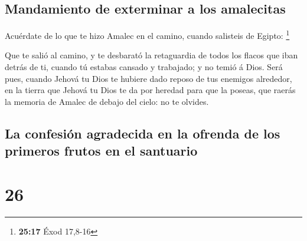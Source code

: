 \hypertarget{mandamiento-de-exterminar-a-los-amalecitas}{%
\subsection{Mandamiento de exterminar a los
amalecitas}\label{mandamiento-de-exterminar-a-los-amalecitas}}

 Acuérdate de lo que te hizo Amalec en el camino, cuando
salisteis de Egipto: \footnote{\textbf{25:17} Éxod 17,8-16}

 Que te salió al camino, y te desbarató la retaguardia de
todos los flacos que iban detrás de ti, cuando tú estabas cansado y
trabajado; y no temió á Dios.  Será pues, cuando Jehová tu
Dios te hubiere dado reposo de tus enemigos alrededor, en la tierra que
Jehová tu Dios te da por heredad para que la poseas, que raerás la
memoria de Amalec de debajo del cielo: no te olvides.

\hypertarget{la-confesiuxf3n-agradecida-en-la-ofrenda-de-los-primeros-frutos-en-el-santuario}{%
\subsection{La confesión agradecida en la ofrenda de los primeros frutos
en el
santuario}\label{la-confesiuxf3n-agradecida-en-la-ofrenda-de-los-primeros-frutos-en-el-santuario}}

\hypertarget{section-25}{%
\section{26}\label{section-25}}

